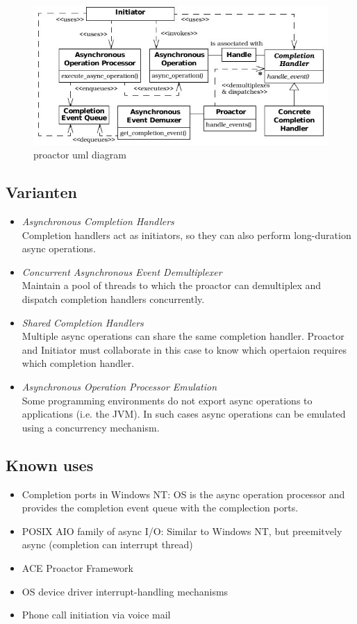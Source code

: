 \begin{figure}[H]
	\centering
	\includegraphics[width=12cm]{content/posa2/proactor/images/uml-diagram.jpeg}
	\caption{proactor uml diagram}
\end{figure}


\subsection{Varianten}
\begin{itemize}
	\item \emph{Asynchronous Completion Handlers}\\
	Completion handlers act as initiators, so they can also perform long-duration async operations.
	\item \emph{Concurrent Asynchronous Event Demultiplexer}\\
	Maintain a pool of threads to which the proactor can demultiplex and dispatch completion handlers concurrently.
	\item \emph{Shared Completion Handlers}\\
	Multiple async operations can share the same completion handler. Proactor and Initiator must collaborate in this case to know which opertaion requires which completion handler.
	\item \emph{Asynchronous Operation Processor Emulation}\\
	Some programming environments do not export async operations to applications (i.e. the JVM). In such cases async operations can be emulated using a concurrency mechanism.
\end{itemize}


\subsection{Known uses}

\begin{itemize}
	\item Completion ports in Windows NT: OS is the async operation processor and provides the completion event queue with the complection ports.
	\item POSIX AIO family of async I/O: Similar to Windows NT, but preemitvely async (completion can interrupt thread)
	\item ACE Proactor Framework
	\item OS device driver interrupt-handling mechanisms
	\item Phone call initiation via voice mail
\end{itemize}


